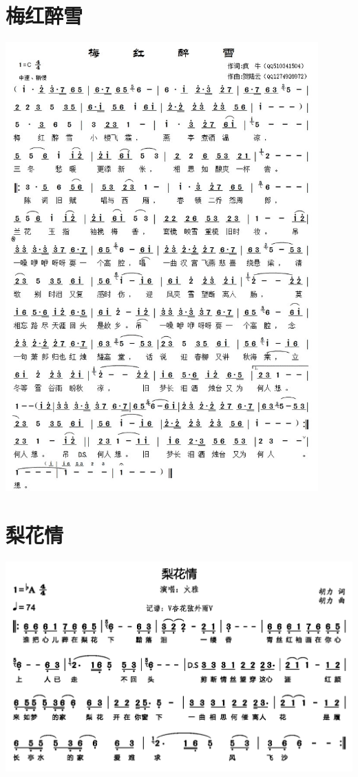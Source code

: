 \documentclass[cn,pad,twocol]{elegantbook}
\begin{document}
\section{梅红醉雪} \includegraphics[width=0.9\textwidth]{rpi400/20210206梅红醉雪.jpg}
\section{梨花情} \includegraphics[width=\textwidth]{rpi400/20210206梨花情.png}
\end{document}
